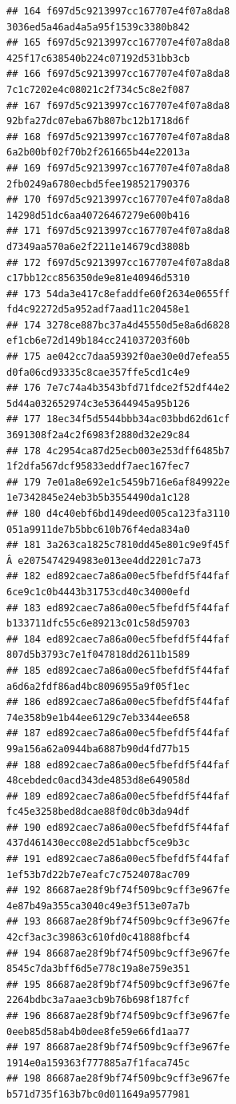 \documentclass[]{article}
\begin{document}
\begin{verbatim}
## 164 f697d5c9213997cc167707e4f07a8da8   3036ed5a46ad4a5a95f1539c3380b842
## 165 f697d5c9213997cc167707e4f07a8da8   425f17c638540b224c07192d531bb3cb
## 166 f697d5c9213997cc167707e4f07a8da8   7c1c7202e4c08021c2f734c5c8e2f087
## 167 f697d5c9213997cc167707e4f07a8da8   92bfa27dc07eba67b807bc12b1718d6f
## 168 f697d5c9213997cc167707e4f07a8da8   6a2b00bf02f70b2f261665b44e22013a
## 169 f697d5c9213997cc167707e4f07a8da8   2fb0249a6780ecbd5fee198521790376
## 170 f697d5c9213997cc167707e4f07a8da8   14298d51dc6aa40726467279e600b416
## 171 f697d5c9213997cc167707e4f07a8da8   d7349aa570a6e2f2211e14679cd3808b
## 172 f697d5c9213997cc167707e4f07a8da8   c17bb12cc856350de9e81e40946d5310
## 173 54da3e417c8efaddfe60f2634e0655ff   fd4c92272d5a952adf7aad11c20458e1
## 174 3278ce887bc37a4d45550d5e8a6d6828   ef1cb6e72d149b184cc241037203f60b
## 175 ae042cc7daa59392f0ae30e0d7efea55   d0fa06cd93335c8cae357ffe5cd1c4e9
## 176 7e7c74a4b3543bfd71fdce2f52df44e2   5d44a032652974c3e53644945a95b126
## 177 18ec34f5d5544bbb34ac03bbd62d61cf   3691308f2a4c2f6983f2880d32e29c84
## 178 4c2954ca87d25ecb003e253dff6485b7   1f2dfa567dcf95833eddf7aec167fec7
## 179 7e01a8e692e1c5459b716e6af849922e   1e7342845e24eb3b5b3554490da1c128
## 180 d4c40ebf6bd149deed005ca123fa3110   051a9911de7b5bbc610b76f4eda834a0
## 181 3a263ca1825c7810dd45e801c9e9f45f Â e2075474294983e013ee4dd2201c7a73
## 182 ed892caec7a86a00ec5fbefdf5f44faf   6ce9c1c0b4443b31753cd40c34000efd
## 183 ed892caec7a86a00ec5fbefdf5f44faf   b133711dfc55c6e89213c01c58d59703
## 184 ed892caec7a86a00ec5fbefdf5f44faf   807d5b3793c7e1f047818dd2611b1589
## 185 ed892caec7a86a00ec5fbefdf5f44faf   a6d6a2fdf86ad4bc8096955a9f05f1ec
## 186 ed892caec7a86a00ec5fbefdf5f44faf   74e358b9e1b44ee6129c7eb3344ee658
## 187 ed892caec7a86a00ec5fbefdf5f44faf   99a156a62a0944ba6887b90d4fd77b15
## 188 ed892caec7a86a00ec5fbefdf5f44faf   48cebdedc0acd343de4853d8e649058d
## 189 ed892caec7a86a00ec5fbefdf5f44faf   fc45e3258bed8dcae88f0dc0b3da94df
## 190 ed892caec7a86a00ec5fbefdf5f44faf   437d461430ecc08e2d51abbcf5ce9b3c
## 191 ed892caec7a86a00ec5fbefdf5f44faf   1ef53b7d22b7e7eafc7c7524078ac709
## 192 86687ae28f9bf74f509bc9cff3e967fe   4e87b49a355ca3040c49e3f513e07a7b
## 193 86687ae28f9bf74f509bc9cff3e967fe   42cf3ac3c39863c610fd0c41888fbcf4
## 194 86687ae28f9bf74f509bc9cff3e967fe   8545c7da3bff6d5e778c19a8e759e351
## 195 86687ae28f9bf74f509bc9cff3e967fe   2264bdbc3a7aae3cb9b76b698f187fcf
## 196 86687ae28f9bf74f509bc9cff3e967fe   0eeb85d58ab4b0dee8fe59e66fd1aa77
## 197 86687ae28f9bf74f509bc9cff3e967fe   1914e0a159363f777885a7f1faca745c
## 198 86687ae28f9bf74f509bc9cff3e967fe   b571d735f163b7bc0d011649a9577981

\end{verbatim}
\end{document}
